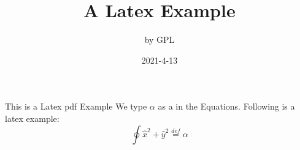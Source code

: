 \documentclass[a4paper,10pt]{article}
\title{A Latex Example}
\author{by GPL}
\date{2021-4-13}
\begin{document}
\maketitle
This is a Latex pdf Example
We type $\alpha$ as a in the Equations. Following is a latex example:
$$\oint{\hat x^2+\hat y^2}\overset{def}{=}\alpha$$
\end{document}
